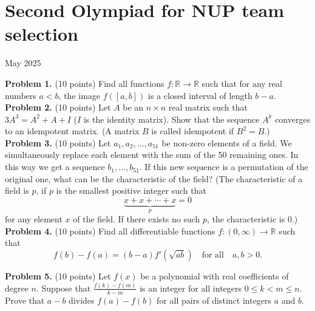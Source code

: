 \documentclass{article}
\begin{document}
\pagestyle{plain}

\section*{Second Olympiad for NUP team selection}

\begin{center}
May 2025
\end{center}

\textbf{Problem 1.} (10 points)
Find all functions $f : \mathbb{R} \to \mathbb{R}$ such that for any real numbers $a < b$, the image $f([a,b])$ is a closed interval of length $b - a$. \\

\textbf{Problem 2.} (10 points)
Let $A$ be an $n \times n$ real matrix such that $3A^3 = A^2 + A + I$ ($I$ is the identity matrix). Show that the sequence $A^k$ converges to an idempotent matrix. (A matrix $B$ is called idempotent if $B^2 = B$.) \\

\textbf{Problem 3.} (10 points)
Let $a_1, a_2, \ldots, a_{51}$ be non-zero elements of a field. We simultaneously replace each element with the sum of the 50 remaining ones. In this way we get a sequence $b_1, \ldots, b_{51}$. If this new sequence is a permutation of the original one, what can be the characteristic of the field? (The characteristic of a field is $p$, if $p$ is the smallest positive integer such that
\[
\underbrace{x + x + \cdots + x}_{p} = 0
\]
for any element $x$ of the field. If there exists no such $p$, the characteristic is 0.) \\

\textbf{Problem 4.} (10 points)
Find all differentiable functions $f : (0, \infty) \to \mathbb{R}$ such that
\[
f(b) - f(a) = (b - a) f'\left( \sqrt{ab} \right) \quad \text{for all} \quad a, b > 0.
\]

\textbf{Problem 5.} (10 points)
Let $f(x)$ be a polynomial with real coefficients of degree $n$.
Suppose that \( \frac{f(k) - f(m)}{k - m} \)
is an integer for all integers $0 \leq k < m \leq n$.
Prove that $a - b$ divides $f(a) - f(b)$ for all pairs of distinct integers $a$ and $b$. \\
\end{document}
